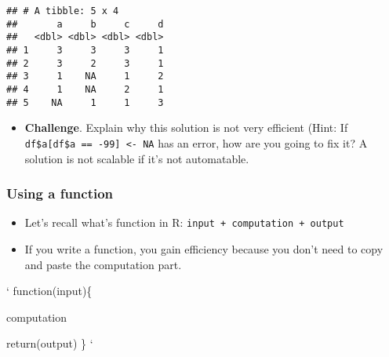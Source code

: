 \documentclass[
]{book}
\newenvironment{Shaded}{\begin{snugshade}}{\end{snugshade}}
\newcommand{\CommentTok}[1]{\textcolor[rgb]{0.56,0.35,0.01}{\textit{#1}}}
\newcommand{\ControlFlowTok}[1]{\textcolor[rgb]{0.13,0.29,0.53}{\textbf{#1}}}
\newcommand{\DecValTok}[1]{\textcolor[rgb]{0.00,0.00,0.81}{#1}}
\newcommand{\KeywordTok}[1]{\textcolor[rgb]{0.13,0.29,0.53}{\textbf{#1}}}
\newcommand{\NormalTok}[1]{#1}
\newcommand{\OperatorTok}[1]{\textcolor[rgb]{0.81,0.36,0.00}{\textbf{#1}}}
\newcommand{\OtherTok}[1]{\textcolor[rgb]{0.56,0.35,0.01}{#1}}
\newcommand{\StringTok}[1]{\textcolor[rgb]{0.31,0.60,0.02}{#1}}
\providecommand{\tightlist}{%
  \setlength{\itemsep}{0pt}\setlength{\parskip}{0pt}}
\begin{document}
\begin{verbatim}
## # A tibble: 5 x 4
##       a     b     c     d
##   <dbl> <dbl> <dbl> <dbl>
## 1     3     3     3     1
## 2     3     2     3     1
## 3     1    NA     1     2
## 4     1    NA     2     1
## 5    NA     1     1     3
\end{verbatim}

\begin{itemize}
\tightlist
\item
  \textbf{Challenge}. Explain why this solution is not very efficient (Hint: If \texttt{df\$a{[}df\$a\ ==\ -99{]}\ \textless{}-\ NA} has an error, how are you going to fix it? A solution is not scalable if it's not automatable.
\end{itemize}

\hypertarget{using-a-function}{%
\subsubsection{Using a function}\label{using-a-function}}

\begin{itemize}
\item
  Let's recall what's function in R: \texttt{input\ +\ computation\ +\ output}
\item
  If you write a function, you gain efficiency because you don't need to copy and paste the computation part.
\end{itemize}

`
function(input)\{

computation

return(output)
\}
`

\begin{Shaded}
\end{Shaded}
\end{document}
